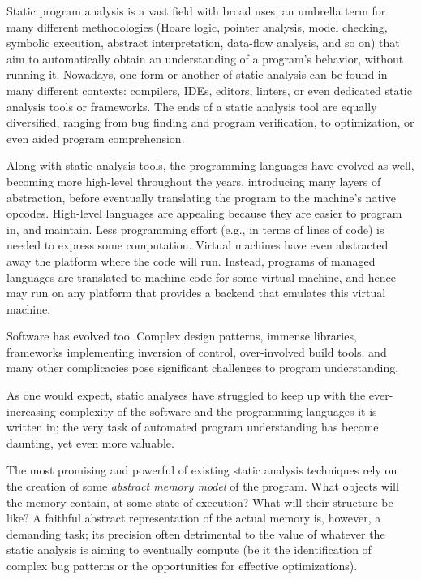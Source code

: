 Static program analysis is a vast field with broad uses; an umbrella
term for many different methodologies (Hoare logic, pointer analysis,
model checking, symbolic execution, abstract interpretation, data-flow
analysis, and so on) that aim to automatically obtain an understanding
of a program's behavior, without running it. Nowadays, one form or
another of static analysis can be found in many different contexts:
compilers, IDEs, editors, linters, or even dedicated static analysis
tools or frameworks. The ends of a static analysis tool are equally
diversified, ranging from bug finding and program verification, to
optimization, or even aided program comprehension.

Along with static analysis tools, the programming languages have
evolved as well, becoming more high-level throughout the years,
introducing many layers of abstraction, before eventually translating
the program to the machine's native opcodes. High-level languages are
appealing because they are easier to program in, and maintain. Less
programming effort (e.g., in terms of lines of code) is needed to
express some computation. Virtual machines have even abstracted away
the platform where the code will run. Instead, programs of managed
languages are translated to machine code for some virtual machine, and
hence may run on any platform that provides a backend that emulates
this virtual machine.

Software has evolved too. Complex design patterns, immense libraries,
frameworks implementing inversion of control, over-involved build
tools, and many other complicacies pose significant challenges to
program understanding.

As one would expect, static analyses have struggled to keep up with
the ever-increasing complexity of the software and the programming
languages it is written in; the very task of automated program
understanding has become daunting, yet even more valuable.

The most promising and powerful of existing static analysis techniques
rely on the creation of some \emph{abstract memory model} of the
program. What objects will the memory contain, at some state of
execution? What will their structure be like?  A faithful abstract
representation of the actual memory is, however, a demanding task; its
precision often detrimental to the value of whatever the static
analysis is aiming to eventually compute (be it the identification of
complex bug patterns or the opportunities for effective
optimizations).

